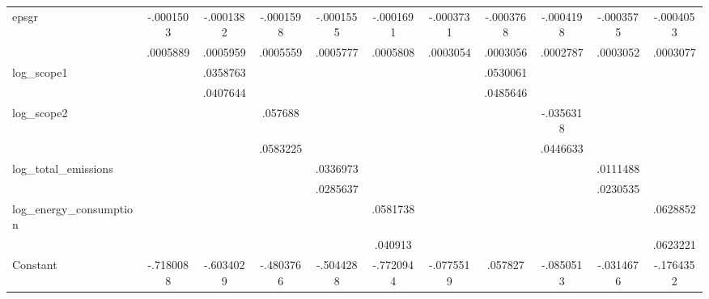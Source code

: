\begin{table}[htbp]
\begin{tabular}{l*{10}{c}}
epsgr           &-.0001503         &-.0001382         &-.0001598         &-.0001555         &-.0001691         &-.0003731         &-.0003768         &-.0004198         &-.0003575         &-.0004053         \\
                & .0005889         & .0005959         & .0005559         & .0005777         & .0005808         & .0003054         & .0003056         & .0002787         & .0003052         & .0003077         \\
log\_scope1      &                  & .0358763         &                  &                  &                  &                  & .0530061         &                  &                  &                  \\
                &                  & .0407644         &                  &                  &                  &                  & .0485646         &                  &                  &                  \\
log\_scope2      &                  &                  &  .057688         &                  &                  &                  &                  &-.0356318         &                  &                  \\
                &                  &                  & .0583225         &                  &                  &                  &                  & .0446633         &                  &                  \\
log\_total\_emissions&                  &                  &                  & .0336973         &                  &                  &                  &                  & .0111488         &                  \\
                &                  &                  &                  & .0285637         &                  &                  &                  &                  & .0230535         &                  \\
log\_energy\_consumption&                  &                  &                  &                  & .0581738         &                  &                  &                  &                  & .0628852         \\
                &                  &                  &                  &                  &  .040913         &                  &                  &                  &                  & .0623221         \\
Constant        &-.7180088         &-.6034029         &-.4803766         &-.5044288         &-.7720944         &-.0775519         &  .057827         &-.0850513         &-.0314676         &-.1764352         \\

\end{tabular}
\end{table}
